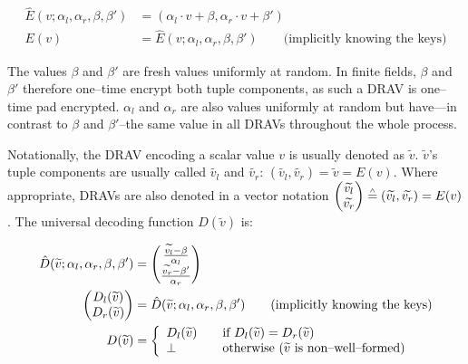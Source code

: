 \begin{align}
  \label{eqn:one-time-pad}
  \hat{E}(v; \alpha_l, \alpha_r, \beta, \beta') &=
  (\alpha_l \cdot v + \beta, \alpha_r \cdot v + \beta')\\
  E(v) &= \hat{E}(v; \alpha_l, \alpha_r, \beta, \beta') \qquad
  \text{(implicitly knowing the keys)}\nonumber
\end{align}

\noindent{}The values $\beta$ and $\beta'$ are fresh values uniformly at random.
In finite fields, $\beta$ and $\beta'$ therefore one--time encrypt both tuple
components, as such a DRAV is one--time pad encrypted.  $\alpha_l$ and
$\alpha_r$ are also values uniformly at random but have---in contrast to $\beta$
and $\beta'$--the same value in all DRAVs throughout the whole process.

Notationally, the DRAV encoding a scalar value $v$ is usually denoted as
$\widetilde{v}$. $\widetilde{v}$'s tuple components are usually called
$\widetilde{v_l}$ and $\widetilde{v_r}$: $(\widetilde{v_l}, \widetilde{v_r}) =
\widetilde{v} = E(v)$. Where appropriate, DRAVs are also denoted in a vector
notation $\begin{pmatrix}\widetilde{v_l}\\\widetilde{v_r}\end{pmatrix}
\stackrel{\scriptscriptstyle\wedge}{=} (\widetilde{v_l}, \widetilde{v_r}) = E(v)$. The universal decoding
function $D(\widetilde{v})$ is:

\begin{align}
  \hat{D}(\widetilde{v}; \alpha_l, \alpha_r, \beta, \beta') &=
  \begin{pmatrix}
    \frac{\widetilde{v_l} - \beta}{\alpha_l}\\
    \frac{\widetilde{v_r} - \beta'}{\alpha_r}
  \end{pmatrix} \nonumber\\
  \label{eqn:keys-assumed}
\begin{pmatrix}D_l(\widetilde{v})\\D_r(\widetilde{v})\end{pmatrix} &=
  \hat{D}(\widetilde{v}; \alpha_l, \alpha_r, \beta, \beta') \qquad
  \text{(implicitly knowing the keys)}\\
  D(\widetilde{v}) &=
  \left\{
    \begin{array}{l l}
      D_l(\widetilde{v}) & \quad
      \text{if}~D_l(\widetilde{v}) = D_r(\widetilde{v})\\
      \bot & \quad \text{otherwise ($\widetilde{v}$ is non--well--formed)}\\
    \end{array}\right.\nonumber
\end{align}

